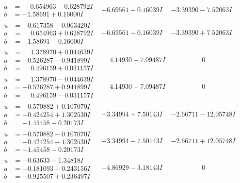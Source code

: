 \documentclass[1p]{elsarticle_modified}
\theoremstyle{definition}
\begin{document}
$$\begin{array}{c|c|c}
\begin{aligned}
a &= \phantom{-}0.654963 - 0.628792 I \\
b &= -1.58691 + 0.16000 I\end{aligned}
 & -6.69561 - 0.16039 I & -3.39390 - 7.52063 I \\ \hline\begin{aligned}
u &= -0.617358 - 0.063420 I \\
a &= \phantom{-}0.654963 + 0.628792 I \\
b &= -1.58691 - 0.16000 I\end{aligned}
 & -6.69561 + 0.16039 I & -3.39390 + 7.52063 I \\ \hline\begin{aligned}
u &= \phantom{-}1.378970 + 0.044639 I \\
a &= -0.526287 - 0.941899 I \\
b &= \phantom{-}0.496159 + 0.031157 I\end{aligned}
 & \phantom{-}4.14930 + 7.09487 I & \phantom{-0.000000 } 0 \\ \hline\begin{aligned}
u &= \phantom{-}1.378970 - 0.044639 I \\
a &= -0.526287 + 0.941899 I \\
b &= \phantom{-}0.496159 - 0.031157 I\end{aligned}
 & \phantom{-}4.14930 - 7.09487 I & \phantom{-0.000000 } 0 \\ \hline\begin{aligned}
u &= -0.570882 + 0.107070 I \\
a &= -0.424254 + 1.302530 I \\
b &= -1.45458 + 0.20173 I\end{aligned}
 & -3.34994 + 7.50143 I & -2.66711 - 12.05748 I \\ \hline\begin{aligned}
u &= -0.570882 - 0.107070 I \\
a &= -0.424254 - 1.302530 I \\
b &= -1.45458 - 0.20173 I\end{aligned}
 & -3.34994 - 7.50143 I & -2.66711 + 12.05748 I \\ \hline\begin{aligned}
u &= -0.63633 + 1.34818 I \\
a &= -0.181093 - 0.243156 I \\
b &= -0.925507 + 0.236497 I\end{aligned}
 & -4.86929 - 3.18143 I & \phantom{-0.000000 } 0 \\ \hline\begin{aligned}

\end{aligned}
\end{array}$$
\end{document}
